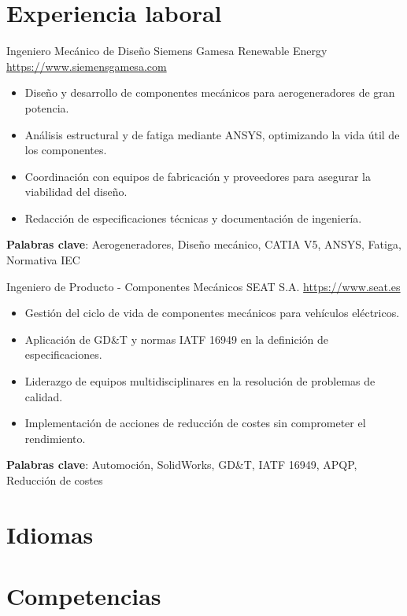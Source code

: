 \documentclass[a4paper, serif, 10pt]{moderncv}
\begin{document}
\section{Experiencia laboral}

        {Ingeniero Mecánico de Diseño}
        {Siemens Gamesa Renewable Energy}
        {\url{https://www.siemensgamesa.com}}
        {}
        {\begin{itemize}
\item Diseño y desarrollo de componentes mecánicos para aerogeneradores de gran potencia.
\item Análisis estructural y de fatiga mediante ANSYS, optimizando la vida útil de los componentes.
\item Coordinación con equipos de fabricación y proveedores para asegurar la viabilidad del diseño.
\item Redacción de especificaciones técnicas y documentación de ingeniería.
\end{itemize}
\textbf{Palabras clave}: Aerogeneradores, Diseño mecánico, CATIA V5, ANSYS, Fatiga, Normativa IEC}

        {Ingeniero de Producto - Componentes Mecánicos}
        {SEAT S.A.}
        {\url{https://www.seat.es}}
        {}
        {\begin{itemize}
\item Gestión del ciclo de vida de componentes mecánicos para vehículos eléctricos.
\item Aplicación de GD\&T y normas IATF 16949 en la definición de especificaciones.
\item Liderazgo de equipos multidisciplinares en la resolución de problemas de calidad.
\item Implementación de acciones de reducción de costes sin comprometer el rendimiento.
\end{itemize}
\textbf{Palabras clave}: Automoción, SolidWorks, GD\&T, IATF 16949, APQP, Reducción de costes}
\section{Idiomas}

\section{Competencias}
\end{document}
